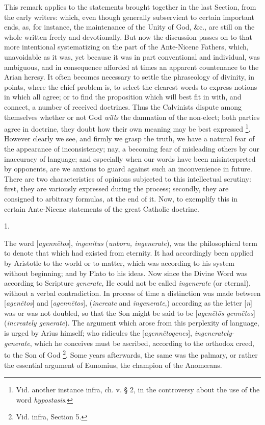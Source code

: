 This remark applies to the statements brought together in the last
Section, from the early writers: which, even though generally
subservient to certain important ends, as, for instance, the
maintenance of the Unity of God, \&c., are still on the whole
written freely and devotionally. But now the discussion passes on to
that more intentional systematizing on the part of the Ante-Nicene
Fathers, which, unavoidable as it was, yet because it was in part
conventional and individual, was ambiguous, and in consequence
afforded at times an apparent countenance to the Arian heresy. It
often becomes necessary to settle the phraseology of divinity, in
points, where the chief problem is, to select the clearest words to
express notions in which all agree; or to find the proposition which
will best fit in with, and connect, a number of received doctrines.
Thus the Calvinists dispute among themselves whether or not God \emph{wills}
the damnation of the non-elect; both parties agree in doctrine, they
doubt how their own meaning may be best expressed \footnote{Vid. another instance infra, ch. v. § 2, in the controversy
about the use of the word \emph{hypostasis}.}. However clearly we see, and firmly we grasp the truth, we have
a natural fear of the appearance of inconsistency; nay, a becoming
fear of misleading others by our inaccuracy of language; and
especially when our words have been misinterpreted by opponents, are
we anxious to guard against such an inconvenience in future. There are
two characteristics of opinions subjected to this intellectual
scrutiny: first, they are variously expressed during the process;
secondly, they are consigned to arbitrary formulas, at the end of it.
Now, to exemplify this in certain Ante-Nicene statements of the great
Catholic doctrine.

1.

The word [\emph{agenn\={e}tos}], \emph{ingenitus} (\emph{unborn,
ingenerate}), was the philosophical term to denote that which had
existed from eternity. It had accordingly been applied by Aristotle to
the world or to matter, which was according to his system without
beginning; and by Plato to his ideas. Now since the Divine Word was
according to Scripture \emph{generate}, He could not be called \emph{ingenerate}
(or eternal), without a verbal contradiction. In process of time a
distinction was made between [\emph{agen\={e}tos}] and [\emph{agenn\={e}tos}],
(\emph{increate} and \emph{ingenerate},) according as the letter [\emph{n}]
was or was not doubled, so that the Son might be said to be [\emph{agen\={e}t\={o}s
genn\={e}tos}] (\emph{increately generate}). The argument which
arose from this perplexity of language, is urged by Arius himself; who
ridicules the [\emph{agenn\={e}togenes}], \emph{ingenerately-generate},
which he conceives must be ascribed, according to the orthodox creed,
to the Son of God \footnote{Vid. infra, Section 5.}. Some
years afterwards, the same was the palmary, or rather the essential
argument of Eunomius, the champion of the Anomœans.

